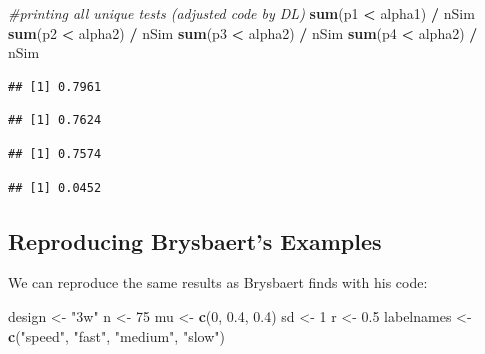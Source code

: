 \documentclass[]{book}
\newenvironment{Shaded}{\begin{snugshade}}{\end{snugshade}}
\newcommand{\CommentTok}[1]{\textcolor[rgb]{0.56,0.35,0.01}{\textit{#1}}}
\newcommand{\DecValTok}[1]{\textcolor[rgb]{0.00,0.00,0.81}{#1}}
\newcommand{\FloatTok}[1]{\textcolor[rgb]{0.00,0.00,0.81}{#1}}
\newcommand{\KeywordTok}[1]{\textcolor[rgb]{0.13,0.29,0.53}{\textbf{#1}}}
\newcommand{\NormalTok}[1]{#1}
\newcommand{\OperatorTok}[1]{\textcolor[rgb]{0.81,0.36,0.00}{\textbf{#1}}}
\newcommand{\StringTok}[1]{\textcolor[rgb]{0.31,0.60,0.02}{#1}}
\begin{document}
\begin{Shaded}
\begin{Highlighting}[]
\CommentTok{#printing all unique tests (adjusted code by DL)}
\KeywordTok{sum}\NormalTok{(p1 }\OperatorTok{<}\StringTok{ }\NormalTok{alpha1) }\OperatorTok{/}\StringTok{ }\NormalTok{nSim}
\KeywordTok{sum}\NormalTok{(p2 }\OperatorTok{<}\StringTok{ }\NormalTok{alpha2) }\OperatorTok{/}\StringTok{ }\NormalTok{nSim}
\KeywordTok{sum}\NormalTok{(p3 }\OperatorTok{<}\StringTok{ }\NormalTok{alpha2) }\OperatorTok{/}\StringTok{ }\NormalTok{nSim}
\KeywordTok{sum}\NormalTok{(p4 }\OperatorTok{<}\StringTok{ }\NormalTok{alpha2) }\OperatorTok{/}\StringTok{ }\NormalTok{nSim}
\end{Highlighting}
\end{Shaded}

\begin{verbatim}
## [1] 0.7961
\end{verbatim}

\begin{verbatim}
## [1] 0.7624
\end{verbatim}

\begin{verbatim}
## [1] 0.7574
\end{verbatim}

\begin{verbatim}
## [1] 0.0452
\end{verbatim}

\hypertarget{reproducing-brysbaerts-examples}{%
\subsection{Reproducing Brysbaert's Examples}\label{reproducing-brysbaerts-examples}}

We can reproduce the same results as Brysbaert finds with his code:

\begin{Shaded}
\begin{Highlighting}[]
\NormalTok{design <-}\StringTok{ "3w"}
\NormalTok{n <-}\StringTok{ }\DecValTok{75}
\NormalTok{mu <-}\StringTok{ }\KeywordTok{c}\NormalTok{(}\DecValTok{0}\NormalTok{, }\FloatTok{0.4}\NormalTok{, }\FloatTok{0.4}\NormalTok{)}
\NormalTok{sd <-}\StringTok{ }\DecValTok{1}
\NormalTok{r <-}\StringTok{ }\FloatTok{0.5}
\NormalTok{labelnames <-}\StringTok{ }\KeywordTok{c}\NormalTok{(}\StringTok{"speed"}\NormalTok{, }\StringTok{"fast"}\NormalTok{, }\StringTok{"medium"}\NormalTok{, }\StringTok{"slow"}\NormalTok{)}
\end{Highlighting}
\end{Shaded}
\end{document}
